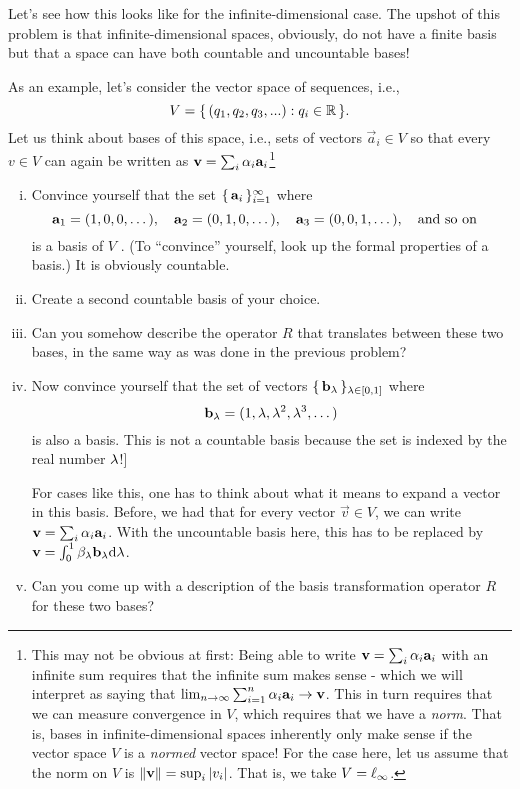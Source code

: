 \documentclass[12pt]{memoir}
\begin{document}
\begin{Ej}
    Let's see how this looks like for the infinite-dimensional case.
The upshot of this problem is that infinite-dimensional spaces, obviously, do not have a finite basis but that a space can have both countable and uncountable bases!\par 
As an example, let's consider the vector space of sequences, i.e.,
$$V = \{\,(q_1, q_2, q_3, . . .) : q_i\in\mathbb{R}\,\}.$$
Let us think about bases of this space, i.e., sets of vectors $\vec a_i\in V$ so that every $v \in V$ can again be written
as $\mathbf{v}=\sum_i\alpha_i\mathbf{a}_i$\footnote{This may not be obvious at first: Being able to write $\mathbf{v}=\sum_i\alpha_i\mathbf{a}_i$ with an infinite sum requires that the infinite sum makes
sense - which we will interpret as saying that $\lim_{n\to\infty}\sum_{i=1}^n\alpha_i\mathbf{a}_i\to \mathbf{v}$. This in turn requires that we can measure convergence
in $V$, which requires that we have a \emph{norm}. That is, bases in infinite-dimensional spaces inherently only make sense if the vector
space $V$ is a \emph{normed} vector space! For the case here, let us assume that the norm on $V$ is $\norm{\mathbf{v}}=\sup_i|v_i|$. That is, we take $V=\ell_\infty$.}
\begin{enumerate}[(i)]
    \item Convince yourself that the set $\{\,\mathbf{a}_i\,\}_{i=1}^\infty$ where 
    $$\mathbf{a}_1=(1,0,0,\dots),\quad\mathbf{a}_2=(0,1,0,\dots),\quad\mathbf{a}_3=(0,0,1,\dots),\quad\text{and so on}\quad$$
    is a basis of $V$ . (To ``convince'' yourself, look up the formal properties of a basis.) It is obviously countable.
    \item Create a second countable basis of your choice.
    \item Can you somehow describe the operator $R$ that translates between these two bases, in the same way as was done in the previous problem?
    \item Now convince yourself that the set of vectors $\{\,\mathbf{b}_\lambda\,\}_{\lambda\in\left\lbrack0,1\right\rbrack}$ where 
    $$\mathbf{b}_\lambda=(1,\lambda,\lambda^2,\lambda^3,\dots)$$ 
    is also a basis. This is not a countable basis because the set is indexed by the real number $\lambda$!]\par 
    For cases like this, one has to think about what it means to expand a vector in this basis. Before, we had that for every vector $\vec v\in V$, we can write $\mathbf{v}=\sum_i\alpha_i\mathbf{a}_i$. With the uncountable basis here, this has
    to be replaced by $\mathbf{v}=\int_0^1\beta_\lambda\mathbf{b}_\lambda\dd\lambda$.
    \item Can you come up with a description of the basis transformation operator $R$ for these two bases?
\end{enumerate}
\end{Ej}
\end{document}
